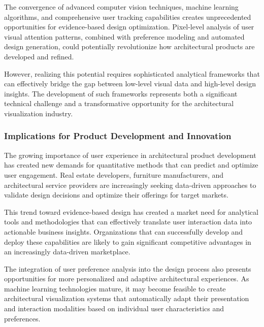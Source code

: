 \documentclass[12pt,a4paper]{book}
\begin{document}
The convergence of advanced computer vision techniques, machine learning algorithms, and comprehensive user tracking capabilities creates unprecedented opportunities for evidence-based design optimization. Pixel-level analysis of user visual attention patterns, combined with preference modeling and automated design generation, could potentially revolutionize how architectural products are developed and refined.

However, realizing this potential requires sophisticated analytical frameworks that can effectively bridge the gap between low-level visual data and high-level design insights. The development of such frameworks represents both a significant technical challenge and a transformative opportunity for the architectural visualization industry.

\subsubsection{Implications for Product Development and Innovation}
\label{subsubsec:product_development_implications}

The growing importance of user experience in architectural product development has created new demands for quantitative methods that can predict and optimize user engagement. Real estate developers, furniture manufacturers, and architectural service providers are increasingly seeking data-driven approaches to validate design decisions and optimize their offerings for target markets.

This trend toward evidence-based design has created a market need for analytical tools and methodologies that can effectively translate user interaction data into actionable business insights. Organizations that can successfully develop and deploy these capabilities are likely to gain significant competitive advantages in an increasingly data-driven marketplace.

The integration of user preference analysis into the design process also presents opportunities for more personalized and adaptive architectural experiences. As machine learning technologies mature, it may become feasible to create architectural visualization systems that automatically adapt their presentation and interaction modalities based on individual user characteristics and preferences.

\end{document}
